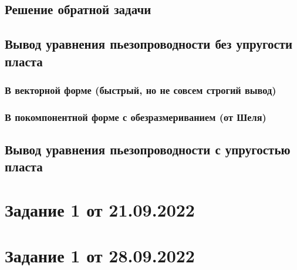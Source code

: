 \documentclass[a4paper,12pt]{article}
\begin{document}
\subsection{Решение обратной задачи}

\subsection{Вывод уравнения пьезопроводности без упругости пласта}

\subsubsection{В векторной форме (быстрый, но не совсем строгий вывод)}

\subsubsection{В покомпонентной форме с обезразмериванием (от Шеля)}

\subsection{Вывод уравнения пьезопроводности с упругостью пласта}

\section{Задание 1 от 21.09.2022}

\section{Задание 1 от 28.09.2022}
\end{document}
